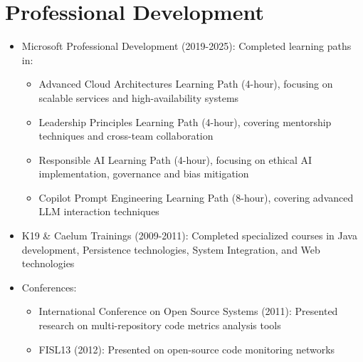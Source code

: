 
\section{Professional Development}
\begin{itemize}
    \item \small{Microsoft Professional Development (2019-2025):}
          \footnotesize{Completed learning paths in:}
          \begin{itemize}[itemsep=1pt, parsep=0pt]
              \item \footnotesize{Advanced Cloud Architectures Learning Path (4-hour), focusing on scalable \lowercase{\BackEnd} services and high-availability systems}
              \item \footnotesize{Leadership Principles Learning Path (4-hour), covering mentorship techniques and cross-team collaboration}
              \item \footnotesize{Responsible AI Learning Path (4-hour), focusing on ethical AI implementation, governance and bias mitigation}
              \item \footnotesize{Copilot Prompt Engineering Learning Path (8-hour), covering advanced LLM interaction techniques}
          \end{itemize}
    \item \small{K19 \& Caelum Trainings (2009-2011):} \footnotesize{Completed specialized courses in Java development, Persistence technologies, System Integration, and Web technologies}
    \item \small{Conferences:}
          \begin{itemize}[itemsep=1pt, parsep=0pt]
              \item \footnotesize{International Conference on Open Source Systems (2011): Presented research on multi-repository code metrics analysis tools}
              \item \footnotesize{FISL13 (2012): Presented on open-source code monitoring networks}
          \end{itemize}
\end{itemize}